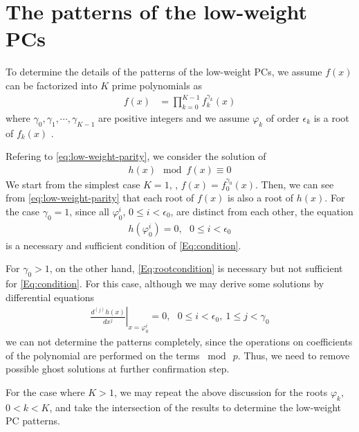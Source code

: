 \section{The patterns of the low-weight PCs}
\label{sec3}
To determine the details of the patterns of the low-weight PCs, we assume $f(x)$ can be factorized into $K$ prime polynomials as 
\begin{align}
f(x)&=\prod_{k=0}^{K-1}f_k^{\gamma_k}(x)
\end{align}
where $\gamma_0,\gamma_1,\cdots,\gamma_{K-1}$ are positive integers and we assume $\varphi_k$ of order $\epsilon_k$ is a root of $f_{k}(x)$ .

Refering to \eqref{eq:low-weight-parity}, we consider the solution of
\begin{align}
	h(x) \mod f(x) \equiv 0
	\label{Eq:condition}
\end{align}
%
We start from the simplest case $K=1$, \ie, $f(x) = f_0^{\gamma_0}(x)$. Then, we can see from \eqref{eq:low-weight-parity} that each root of $f(x)$ is also a root of $h(x)$. For the case $\gamma_0 = 1$, since all $\varphi_0^i$, $0 \leq i < \epsilon_0$, are distinct from each other, the equation
\begin{align}
	h(\varphi_0^i)=0,~~~ 0 \leq i < \epsilon_0
	\label{Eq:rootcondition}
\end{align}
is a necessary and sufficient condition of \eqref{Eq:condition}. 

For $\gamma_0 > 1$, on the other hand, \eqref{Eq:rootcondition} is necessary but not sufficient for \eqref{Eq:condition}. For this case, although we may derive some solutions by differential equations
\begin{align}
\left.\frac{d^{(j)}h(x)}{d x^j}\right|_{x=\varphi_0^i}=0,~~~0 \leq i < \epsilon_0,~1 \leq j < \gamma_0
\label{Eq:differential}
\end{align}
we can not determine the patterns completely, since the operations on coefficients of the polynomial are performed on the terms $\bmod~ p$. Thus, we need to remove possible ghost solutions at further confirmation step.

For the case where $K>1$, we may repeat the above discussion for the roots $\varphi_k$, $0 < k < K$, and take the intersection of the results to determine the low-weight PC patterns.

